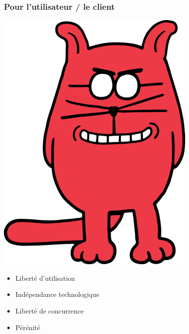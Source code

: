\documentclass[english]{beamer}
\begin{document}
\begin{frame}
  \frametitle{Pour l'utilisateur / le client}
  \vspace{-2em}
  \begin{center}
    \includegraphics[scale=0.2]{catbert.png}
  \end{center}
  \vspace{-1em}
  \begin{itemize}
  \item <2-> Liberté d'utilisation
  \item <3-> Indépendance technologique
  \item <4-> Liberté de concurrence
  \item <5-> Pérénité
  \end{itemize}
\end{frame}
\end{document}
